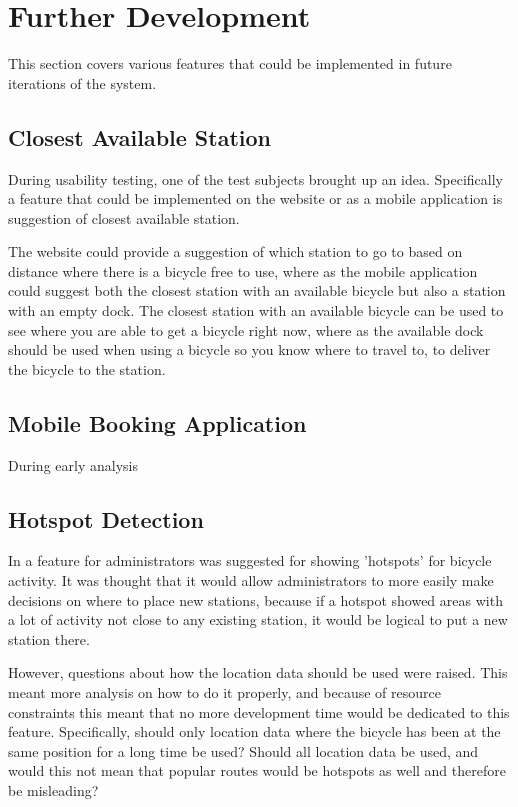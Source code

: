 \section{Further Development}
This section covers various features that could be implemented in future iterations of the system.

\subsection{Closest Available Station}
During usability testing, one of the test subjects brought up an idea.
Specifically a feature that could be implemented on the website or as a mobile application is suggestion of closest available station.

The website could provide a suggestion of which station to go to based on distance where there is a bicycle free to use, where as the mobile application could suggest both the closest station with an available bicycle but also a station with an empty dock.
The closest station with an available bicycle can be used to see where you are able to get a bicycle right now, where as the available dock should be used when using a bicycle so you know where to travel to, to deliver the bicycle to the station.

\subsection{Mobile Booking Application}
During early analysis

\subsection{Hotspot Detection}
In  a feature for administrators was suggested for showing 'hotspots' for bicycle activity. 
It was thought that it would allow administrators to more easily make decisions on where to place new stations, because if a hotspot showed areas with a lot of activity not close to any existing station, it would be logical to put a new station there.

However, questions about how the location data should be used were raised.
This meant more analysis on how to do it properly, and because of resource constraints this meant that no more development time would be dedicated to this feature. 
Specifically, should only location data where the bicycle has been at the same position for a long time be used? 
Should all location data be used, and would this not mean that popular routes would be hotspots as well and therefore be misleading? 

